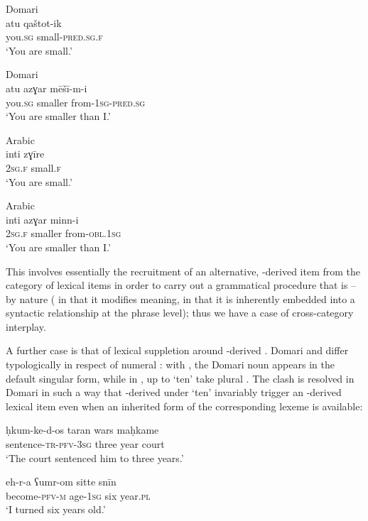 \documentclass[output=paper]{langsci/langscibook}
\begin{document}
\ea\label{comp}
\ea
{Domari}\\
\gll atu qaštot-ik    \\
           you.\textsc{sg} small-\textsc{pred.sg.f}\\
\glt       ‘You are small.’

\ex
{Domari}\\
\gll atu azɣar mēšī-m-i    \\
           you.\textsc{sg} smaller from-\textsc{1sg-pred.sg}\\
\glt       ‘You are smaller than I.’

\ex
{Arabic}\\
\gll inti zɣīre    \\
           \textsc{2sg.f} small.\textsc{f}\\
\glt       ‘You are small.’

\ex
{Arabic}\\
\gll inti azɣar minn-i    \\
           \textsc{2sg.f} smaller from-\textsc{obl.1sg}\\
\glt       ‘You are smaller than I.’
\z
\z


This  involves essentially the recruitment of an alternative, -derived item from the category of lexical items in order to carry out a grammatical procedure that is – by nature ( in that it modifies meaning,  in that it is inherently embedded into a syntactic relationship at the phrase level); thus we have a case of cross-category interplay.

A further case is that of lexical suppletion around -derived . Domari and  differ typologically in respect of numeral : with  , the Domari noun appears in the default singular form, while in ,  up to `ten' take plural . The clash is resolved in Domari in such a way that -derived  under `ten' invariably trigger an -derived lexical item even when an inherited form of the corresponding lexeme is available:

\ea
\ea
\gll ḥkum-ke-d-os taran  wars maḥkame\\
           sentence-\textsc{tr-pfv-3sg} three year court\\
\glt       ‘The court sentenced him to three years.’

\ex
\gll eh-r-a  ʕumr-om sitte snīn\\
           become-\textsc{pfv-m} age-\textsc{1sg} six year\textsc{.pl}\\
\glt       ‘I turned six years old.’
\z
\z
\end{document}
